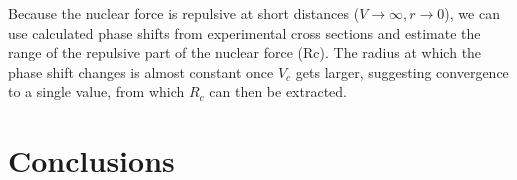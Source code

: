 \documentclass[10pt,showpacs,preprintnumbers,footinbib,amsmath,amssymb,aps,prl,twocolumn,groupedaddress,superscriptaddress,showkeys]{revtex4-1}
\begin{document}
Because the nuclear force is repulsive at short distances ($V \rightarrow \infty, r \rightarrow 0$),
we can use calculated phase shifts from experimental cross sections and estimate the range
of the repulsive part of the nuclear force (Rc). The radius at which the phase shift changes is
almost constant once $V_c$ gets larger, suggesting convergence to a single value, from which
$R_c$ can then be extracted. 








\section{Conclusions}




\end{document}
